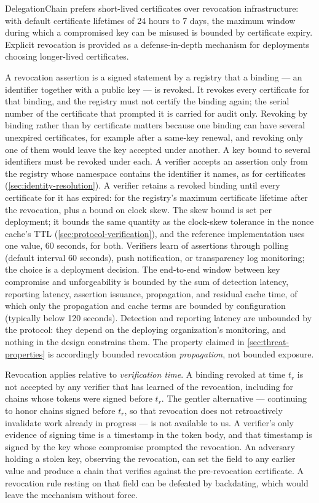 \documentclass[11pt,a4paper]{article}
\begin{document}
DelegationChain prefers short-lived certificates over revocation
infrastructure: with default certificate lifetimes of 24 hours to 7
days, the maximum window during which a compromised key can be misused
is bounded by certificate expiry. Explicit revocation is provided as a
defense-in-depth mechanism for deployments choosing longer-lived
certificates.

A revocation assertion is a signed statement by a registry that a
binding --- an identifier together with a public key --- is revoked. It
revokes every certificate for that binding, and the registry must not
certify the binding again; the serial number of the certificate that
prompted it is carried for audit only. Revoking by binding rather than
by certificate matters because one binding can have several unexpired
certificates, for example after a same-key renewal, and revoking only
one of them would leave the key accepted under another. A key bound to
several identifiers must be revoked under each. A verifier accepts an
assertion only from the registry whose namespace contains the identifier
it names, as for certificates (\cref{sec:identity-resolution}). A
verifier retains a revoked binding until every certificate for it has
expired: for the registry's maximum certificate lifetime after the
revocation, plus a bound on clock skew. The skew bound is set per
deployment; it bounds the same quantity as the clock-skew tolerance in
the nonce cache's TTL (\cref{sec:protocol-verification}), and the
reference implementation uses one value, 60 seconds, for both.
Verifiers learn of assertions through polling (default
interval 60 seconds), push notification, or transparency log
monitoring; the choice is a deployment decision. The end-to-end window
between key compromise and unforgeability is bounded by the sum of
detection latency, reporting latency, assertion issuance,
propagation, and residual cache time, of which only the propagation and
cache terms are bounded by configuration (typically below 120
seconds). Detection and reporting latency are unbounded by the
protocol: they depend on the deploying organization's monitoring, and
nothing in the design constrains them. The property claimed in
\cref{sec:threat-properties} is accordingly bounded revocation
\emph{propagation}, not bounded exposure.

Revocation applies relative to \emph{verification time}. A binding
revoked at time $t_r$ is not accepted by any verifier that has learned
of the revocation, including for chains whose tokens were signed before
$t_r$. The gentler alternative --- continuing to honor chains signed
before $t_r$, so that revocation does not retroactively invalidate work
already in progress --- is not available to us. A verifier's only
evidence of signing time is a timestamp in the token body, and that
timestamp is signed by the key whose compromise prompted the
revocation. An adversary holding a stolen key, observing the
revocation, can set the field to any earlier value and produce a chain
that verifies against the pre-revocation certificate. A revocation rule
resting on that field can be defeated by backdating, which would leave
the mechanism without force.
\end{document}
